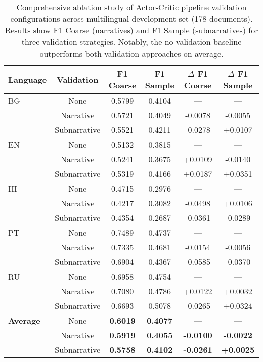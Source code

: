 \begin{table*}[ht]
\centering
\caption{Comprehensive ablation study of Actor-Critic pipeline validation configurations across multilingual development set (178 documents). Results show F1 Coarse (narratives) and F1 Sample (subnarratives) for three validation strategies. Notably, the no-validation baseline outperforms both validation approaches on average.}
\label{tab:actor_critique_ablation}
\small
\begin{tabular}{lccccc}
\hline
\textbf{Language} & \textbf{Validation} & \textbf{F1 Coarse} & \textbf{F1 Sample} & \textbf{$\Delta$ F1 Coarse} & \textbf{$\Delta$ F1 Sample} \\
\hline
BG & None & 0.5799 & 0.4104 & --- & --- \\
   & Narrative & 0.5721 & 0.4049 & -0.0078 & -0.0055 \\
   & Subnarrative & 0.5521 & 0.4211 & -0.0278 & +0.0107 \\
\hline
EN & None & 0.5132 & 0.3815 & --- & --- \\
   & Narrative & 0.5241 & 0.3675 & +0.0109 & -0.0140 \\
   & Subnarrative & 0.5319 & 0.4166 & +0.0187 & +0.0351 \\
\hline
HI & None & 0.4715 & 0.2976 & --- & --- \\
   & Narrative & 0.4217 & 0.3082 & -0.0498 & +0.0106 \\
   & Subnarrative & 0.4354 & 0.2687 & -0.0361 & -0.0289 \\
\hline
PT & None & 0.7489 & 0.4737 & --- & --- \\
   & Narrative & 0.7335 & 0.4681 & -0.0154 & -0.0056 \\
   & Subnarrative & 0.6904 & 0.4367 & -0.0585 & -0.0370 \\
\hline
RU & None & 0.6958 & 0.4754 & --- & --- \\
   & Narrative & 0.7080 & 0.4786 & +0.0122 & +0.0032 \\
   & Subnarrative & 0.6693 & 0.5078 & -0.0265 & +0.0324 \\
\hline
\textbf{Average} & None & \textbf{0.6019} & \textbf{0.4077} & --- & --- \\
                 & Narrative & \textbf{0.5919} & \textbf{0.4055} & \textbf{-0.0100} & \textbf{-0.0022} \\
                 & Subnarrative & \textbf{0.5758} & \textbf{0.4102} & \textbf{-0.0261} & \textbf{+0.0025} \\
\hline
\end{tabular}
\end{table*}

